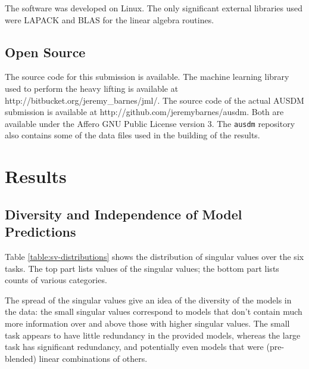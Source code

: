 \documentclass{article}
\begin{document}
The software was developed on Linux.  The only significant external libraries used were LAPACK and BLAS for the linear algebra routines.

\subsection{Open Source}

The source code for this submission is available.  The machine learning library used to perform the heavy lifting is available at http://bitbucket.org/jeremy\_barnes/jml/.  The source code of the actual AUSDM submission is available at http://github.com/jeremybarnes/ausdm.  Both are available under the Affero GNU Public License version 3.  The \texttt{ausdm} repository also contains some of the data files used in the building of the results.

\section{Results}

\subsection{Diversity and Independence of Model Predictions}
\label{sec:svd-decomposition-results}

Table \ref{table:sv-distributions} shows the distribution of singular values over the six tasks.  The top part lists values of the singular values; the bottom part lists counts of various categories.

The spread of the singular values give an idea of the diversity of the models in the data: the small singular values correspond to models that don't contain much more information over and above those with higher singular values.  The small task appears to have little redundancy in the provided models, whereas the large task has significant redundancy, and potentially even models that were (pre-blended) linear combinations of others.

\end{document}
